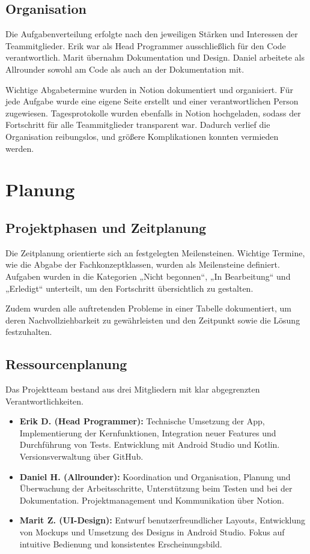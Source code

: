 \documentclass[12pt,a4paper]{article}
\begin{document}
\subsection{Organisation}
Die Aufgabenverteilung erfolgte nach den jeweiligen Stärken und Interessen der Teammitglieder. Erik war als Head Programmer ausschließlich für den Code verantwortlich. Marit übernahm Dokumentation und Design. Daniel arbeitete als Allrounder sowohl am Code als auch an der Dokumentation mit.

Wichtige Abgabetermine wurden in Notion dokumentiert und organisiert. Für jede Aufgabe wurde eine eigene Seite erstellt und einer verantwortlichen Person zugewiesen. Tagesprotokolle wurden ebenfalls in Notion hochgeladen, sodass der Fortschritt für alle Teammitglieder transparent war. Dadurch verlief die Organisation reibungslos, und größere Komplikationen konnten vermieden werden.

\section{Planung}

\subsection{Projektphasen und Zeitplanung}
Die Zeitplanung orientierte sich an festgelegten Meilensteinen. Wichtige Termine, wie die Abgabe der Fachkonzeptklassen, wurden als Meilensteine definiert. Aufgaben wurden in die Kategorien „Nicht begonnen“, „In Bearbeitung“ und „Erledigt“ unterteilt, um den Fortschritt übersichtlich zu gestalten.

Zudem wurden alle auftretenden Probleme in einer Tabelle dokumentiert, um deren Nachvollziehbarkeit zu gewährleisten und den Zeitpunkt sowie die Lösung festzuhalten.

\subsection{Ressourcenplanung}
Das Projektteam bestand aus drei Mitgliedern mit klar abgegrenzten Verantwortlichkeiten.

\begin{itemize}
    \item \textbf{Erik D. (Head Programmer):} Technische Umsetzung der App, Implementierung der Kernfunktionen, Integration neuer Features und Durchführung von Tests. Entwicklung mit Android Studio und Kotlin. Versionsverwaltung über GitHub.
    \item \textbf{Daniel H. (Allrounder):} Koordination und Organisation, Planung und Überwachung der Arbeitsschritte, Unterstützung beim Testen und bei der Dokumentation. Projektmanagement und Kommunikation über Notion.
    \item \textbf{Marit Z. (UI-Design):} Entwurf benutzerfreundlicher Layouts, Entwicklung von Mockups und Umsetzung des Designs in Android Studio. Fokus auf intuitive Bedienung und konsistentes Erscheinungsbild.
\end{itemize}
\end{document}
